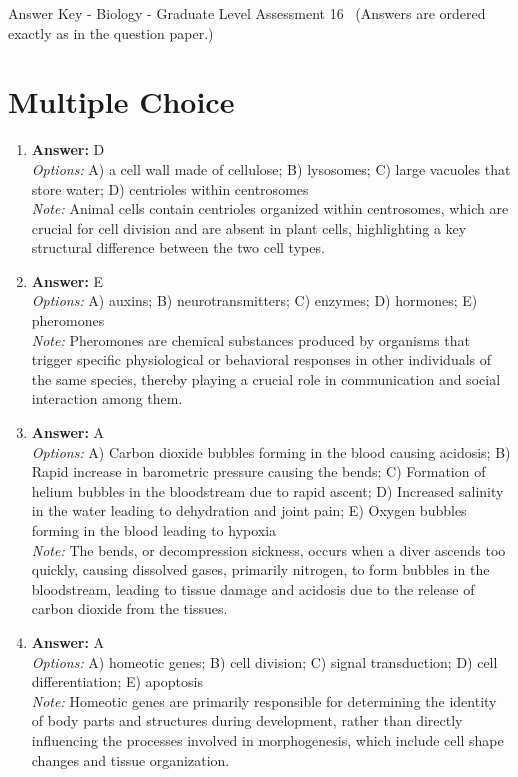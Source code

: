 \documentclass[12pt]{article}
\begin{document}
\begin{center}
Answer Key - Biology - Graduate Level Assessment 16 \
\small (Answers are ordered exactly as in the question paper.)
\end{center}

\section*{Multiple Choice}
\begin{enumerate}[label=\arabic*.]
\item \textbf{Answer:} D
\\ \textit{Options:} A) a cell wall made of cellulose; B) lysosomes; C) large vacuoles that store water; D) centrioles within centrosomes
\\ \textit{Note:} Animal cells contain centrioles organized within centrosomes, which are crucial for cell division and are absent in plant cells, highlighting a key structural difference between the two cell types.
\item \textbf{Answer:} E
\\ \textit{Options:} A) auxins; B) neurotransmitters; C) enzymes; D) hormones; E) pheromones
\\ \textit{Note:} Pheromones are chemical substances produced by organisms that trigger specific physiological or behavioral responses in other individuals of the same species, thereby playing a crucial role in communication and social interaction among them.
\item \textbf{Answer:} A
\\ \textit{Options:} A) Carbon dioxide bubbles forming in the blood causing acidosis; B) Rapid increase in barometric pressure causing the bends; C) Formation of helium bubbles in the bloodstream due to rapid ascent; D) Increased salinity in the water leading to dehydration and joint pain; E) Oxygen bubbles forming in the blood leading to hypoxia
\\ \textit{Note:} The bends, or decompression sickness, occurs when a diver ascends too quickly, causing dissolved gases, primarily nitrogen, to form bubbles in the bloodstream, leading to tissue damage and acidosis due to the release of carbon dioxide from the tissues.
\item \textbf{Answer:} A
\\ \textit{Options:} A) homeotic genes; B) cell division; C) signal transduction; D) cell differentiation; E) apoptosis
\\ \textit{Note:} Homeotic genes are primarily responsible for determining the identity of body parts and structures during development, rather than directly influencing the processes involved in morphogenesis, which include cell shape changes and tissue organization.

\end{enumerate}
\end{document}
